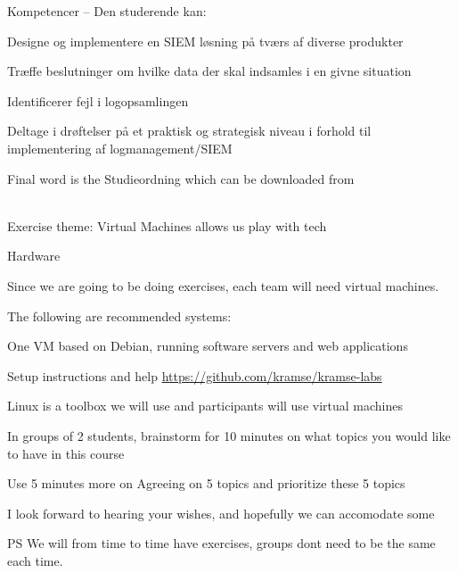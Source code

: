 \documentclass[Screen16to9,17pt]{foils}
\begin{document}
Kompetencer -- Den studerende kan:
\begin{list2}
\item Designe og implementere en SIEM løsning på tværs af diverse produkter
\item Træffe beslutninger om hvilke data der skal indsamles i en givne situation
\item Identificerer fejl i logopsamlingen
\item Deltage i drøftelser på et praktisk og strategisk niveau i forhold til implementering af
logmanagement/SIEM
\end{list2}

Final word is the Studieordning which can be downloaded from\\
{\footnotesize {}\\
}


Exercise theme: Virtual Machines allows us play with tech

Hardware

Since we are going to be doing exercises, each team will need virtual machines.

The following are recommended systems:
\begin{list2}
\item One VM based on Debian, running software servers and web applications
\item Setup instructions and help \url{https://github.com/kramse/kramse-labs}
\end{list2}

Linux is a toolbox we will use and participants will use virtual machines





In groups of 2 students, brainstorm for 10 minutes on what topics you would like to have in this course

Use 5 minutes more on Agreeing on 5 topics and prioritize these 5 topics

I look forward to hearing your wishes, and hopefully we can accomodate some

\vskip 1cm
PS We will from time to time have exercises, groups dont need to be the same each time.
\end{document}

